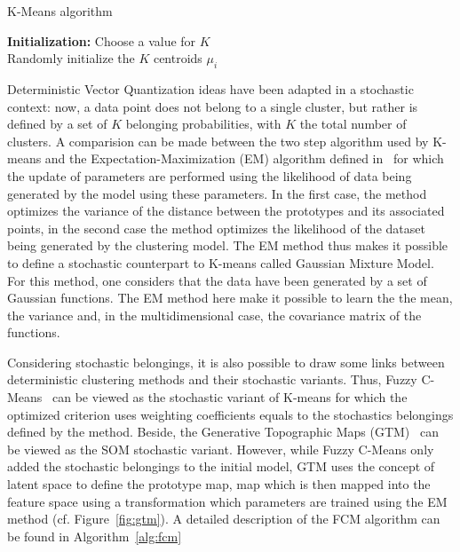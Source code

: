 \documentclass[a4paper]{report}
\begin{document}
    \begin{algorithm}
        \caption{K-Means algorithm}
\label{alg:kmeans}
        \textbf{Initialization:} Choose a value for $K$\\
        Randomly initialize the $K$ centroids $\mu_i$\\
    \end{algorithm}

    Deterministic Vector Quantization ideas have been adapted in a stochastic context: now, a data point does not belong to a single cluster, but rather is defined by a set of $K$ belonging probabilities, with $K$ the total number of clusters. A comparision can be made between the two step algorithm used by K-means and the Expectation-Maximization (EM) algorithm defined in~\cite{dempster1977maximum} for which the update of parameters are performed using the likelihood of data being generated by the model using these parameters. In the first case, the method optimizes the variance of the distance between the prototypes and its associated points, in the second case the method optimizes the likelihood of the dataset being generated by the clustering model. The EM method thus makes it possible to define a stochastic counterpart to K-means called Gaussian Mixture Model. For this method, one considers that the data have been generated by a set of Gaussian functions. The EM method here make it possible to learn the the mean, the variance and, in the multidimensional case, the covariance matrix of the functions.
    
    Considering stochastic belongings, it is also possible to draw some links between deterministic clustering methods and their stochastic variants. Thus, Fuzzy C-Means~\cite{bezdek1984fcm} can be viewed as the stochastic variant of K-means for which the optimized criterion uses weighting coefficients equals to the stochastics belongings defined by the method. Beside, the Generative Topographic Maps (GTM)~\cite{bishop1998gtm} can be viewed as the SOM stochastic variant. However, while Fuzzy C-Means only added the stochastic belongings to the initial model, GTM uses the concept of latent space to define the prototype map, map which is then mapped into the feature space using a transformation which parameters are trained using the EM method (cf. Figure~\ref{fig:gtm}). A detailed description of the FCM algorithm can be found in Algorithm~\ref{alg:fcm}
\end{document}
